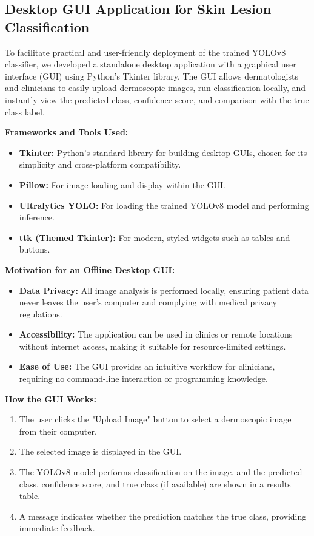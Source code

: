 \documentclass[a4paper,12pt]{report}
\begin{document}
\begin{spacing}{1.5}
    \section{Desktop GUI Application for Skin Lesion Classification}

    To facilitate practical and user-friendly deployment of the trained YOLOv8 classifier, we developed a standalone desktop application with a graphical user interface (GUI) using Python's Tkinter library. The GUI allows dermatologists and clinicians to easily upload dermoscopic images, run classification locally, and instantly view the predicted class, confidence score, and comparison with the true class label.
    
    \textbf{Frameworks and Tools Used:}
    \begin{itemize}
        \item \textbf{Tkinter:} Python's standard library for building desktop GUIs, chosen for its simplicity and cross-platform compatibility.
        \item \textbf{Pillow:} For image loading and display within the GUI.
        \item \textbf{Ultralytics YOLO:} For loading the trained YOLOv8 model and performing inference.
        \item \textbf{ttk (Themed Tkinter):} For modern, styled widgets such as tables and buttons.
    \end{itemize}
    
    \textbf{Motivation for an Offline Desktop GUI:}
    \begin{itemize}
        \item \textbf{Data Privacy:} All image analysis is performed locally, ensuring patient data never leaves the user's computer and complying with medical privacy regulations.
        \item \textbf{Accessibility:} The application can be used in clinics or remote locations without internet access, making it suitable for resource-limited settings.
        \item \textbf{Ease of Use:} The GUI provides an intuitive workflow for clinicians, requiring no command-line interaction or programming knowledge.
    \end{itemize}
    
    \textbf{How the GUI Works:}
    \begin{enumerate}
        \item The user clicks the "Upload Image" button to select a dermoscopic image from their computer.
        \item The selected image is displayed in the GUI.
        \item The YOLOv8 model performs classification on the image, and the predicted class, confidence score, and true class (if available) are shown in a results table.
        \item A message indicates whether the prediction matches the true class, providing immediate feedback.
    \end{enumerate}
    

\end{spacing}
\end{document}
